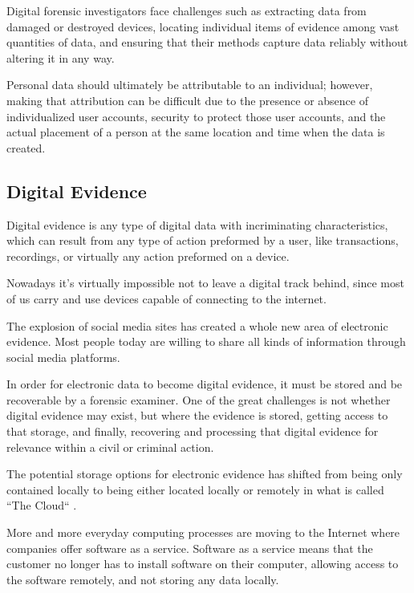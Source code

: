 Digital forensic investigators face challenges such as extracting data from damaged or destroyed
devices, locating individual items of evidence among vast quantities of data,
and ensuring that their methods capture data reliably without altering it in any way.

Personal data should ultimately be attributable to an individual; however, making
that attribution can be difficult due to the presence or absence of individualized
user accounts, security to protect those user accounts, and the actual placement of a
person at the same location and time when the data is created.

\subsection{Digital Evidence}

Digital evidence is any type of digital data with incriminating characteristics,
which can result from any type of action preformed by a user, like transactions,
recordings, or virtually any action preformed on a device.

Nowadays it's virtually impossible not to leave a digital track behind, since most
of us carry and use devices capable of connecting to the internet.

The explosion of social media sites has created a whole new area of electronic
evidence. Most people today are willing to share all kinds of information through
social media platforms.

In order for electronic data to become digital evidence, it must be stored and be recoverable
by a forensic examiner. One of the great challenges is not whether digital
evidence may exist, but where the evidence is stored, getting access to that storage,
and finally, recovering and processing that digital evidence for relevance within
a civil or criminal action.

The potential storage options for electronic evidence has shifted from being only contained locally
to being either located locally or remotely in what is called ``The Cloud`` \cite{cloud}. 

More and more everyday computing processes are moving to the Internet
where companies offer software as a service. Software as a service means that
the customer no longer has to install software on their computer, allowing access to the software remotely,
and not storing any data locally.



